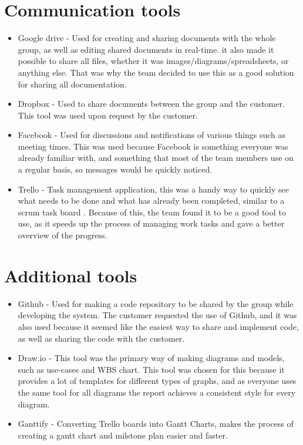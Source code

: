 \section{Communication tools}
\label{sec:communication tools}

\begin{itemize}
	\item Google drive \cite{es10} - Used for creating and sharing documents with the whole group, as well as editing shared documents in real-time. it also made it possible to share all files, whether it was images/diagrams/spreadsheets, or anything else. That was why the team decided to use this as a good solution for sharing all documentation.
	\item Dropbox \cite{es11} - Used to share documents between the group and the customer. This tool was used upon request by the customer.
	\item Facebook \cite{es13} - Used for discussions and notifications of various things such as meeting times. This was used because Facebook is something everyone was already familiar with, and something that most of the team members use on a regular basis, so messages would be quickly noticed.
	\item Trello \cite{es15} - Task management application, this was a handy way to quickly see what needs to be done and what has already been completed, similar to a scrum task board . Because of this, the team found it to be a good tool to use, as it speeds up the process of managing work tasks and gave a better overview of the progress.
\end{itemize}

\section{Additional tools}
\label{sec:additional_tools}

\begin{itemize}
	\item Github \cite{es12} - Used for making a code repository to be shared by the group while developing the system. The customer requested the use of Github, and it was also used because it seemed like the easiest way to share and implement code, as well as sharing the code with the customer.
	\item Draw.io \cite{es14} - This tool was the primary way of making diagrams and models, such as use-cases and WBS chart. This tool was chosen for this because it provides a lot of templates for different types of graphs, and as everyone uses the same tool for all diagrams the report achieves a consistent style for every diagram.
	\item Ganttify \cite{RG1} - Converting Trello boards into Gantt Charts, makes the process of creating a gantt chart and milstone plan easier and faster.
\end{itemize}

\cleardoublepage